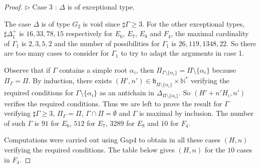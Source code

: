 \documentclass[10pt,a4paper]{amsart}
\numberwithin{equation}{section}
\theoremstyle{plain}
\theoremstyle{definition}
\theoremstyle{remark}
\begin{document}
\begin{proof}
\noindent$\triangleright$ Case 3 : $\Delta$ is of exceptional type.
\smallskip

The case $\Delta$ is of type $G_{2}$ is void since $\sharp \Gamma \geqslant 3$.
For the other exceptional types, $\sharp \Delta_{1}^{+}$ is 
$16, 33, 78, 15$ respectively for $E_{6}$, $E_{7}$, $E_{8}$ and $F_{4}$, the maximal 
cardinality of $\Gamma_{1}$ is $2, 3, 5, 2$ and the number of possibilities for $\Gamma_{1}$ is
$26, 119, 1348, 22$. So there are too many cases to consider for $\Gamma_{1}$
to try to adapt the arguments in case 1. 

Observe that if $\Gamma$ contains a simple root $\alpha_{i}$,
then $\Pi_{\Gamma \setminus \{ \alpha_{i}\} } = \Pi \setminus \{\alpha_{i}\}$ because
$\Pi_{\Gamma} = \Pi$. By induction, 
there exists $(H',n') \in \mathfrak{h}_{\Pi \setminus \{ \alpha_{i}\} } \times \mathbb{N}^{*}$
verifying the required conditions for $\Gamma \setminus \{ \alpha_{i}\}$ as an antichain in 
$\Delta_{\Pi \setminus \{ \alpha_{i}\} }$. So $(H' + n' H_{i} , n' )$ verifies the required
conditions. Thus we are left to prove the result for $\Gamma$ 
verifying $\sharp \Gamma \geqslant 3$, $\Pi_{\Gamma} =\Pi$, 
$\Gamma\cap \Pi = \emptyset$ and $\Gamma$ is maximal 
by inclusion. The number of such $\Gamma$  is 
$91$ for $E_{6}$, $512$ for $E_{7}$, $3289$ for $E_{8}$ and $10$ for $F_{4}$.

Computations were carried out using {\sc Gap4} to obtain in all these cases $(H,n)$ verifying the required 
conditions. The table below gives $(H,n)$ for the $10$ cases in $F_{4}$. 


\end{proof}
\end{document}
